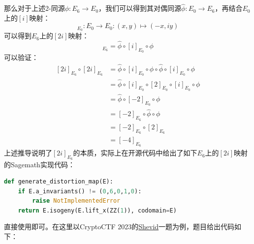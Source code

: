 \documentclass{book}
\numberwithin{equation}{subsubsection}
\begin{document}
那么对于上述2-同源$\phi:E_6\to E_0$，我们可以得到其对偶同源$\hat{\phi}:E_0\to E_6$，再结合$E_0$上的$[i]$映射：
\begin{equation}
    [i]_{E_0}:E_0\to E_0:(x,y)\mapsto(-x,iy)
    \nonumber
\end{equation}
可以得到$E_6$上的$[2i]$映射：
\begin{equation}
    [2i]_{E_6} = \hat{\phi}\circ[i]_{E_0}\circ\phi
    \nonumber
\end{equation}
可以验证：
\begin{equation}
    \begin{aligned}
        [2i]_{E_6}\circ[2i]_{E_6} 
        &= \hat{\phi}\circ[i]_{E_0}\circ\phi\circ\hat{\phi}\circ[i]_{E_0}\circ\phi\\
        &= \hat{\phi}\circ[i]_{E_0}\circ[2]_{E_0}\circ[i]_{E_0}\circ\phi\\
        &= \hat{\phi}\circ[-2]_{E_0}\circ\phi\\
        &= [-2]_{E_6}\circ\hat{\phi}\circ\phi\\
        &= [-2]_{E_6}\circ[2]_{E_6}\\
        &= [-4]_{E_6}
    \end{aligned}
    \nonumber
\end{equation}
上述推导说明了$[2i]_{E_6}$的本质，实际上在开源代码中给出了如下$E_6$上的$[2i]$映射的Sagemath实现代码：
\begin{lstlisting}[language=Python,basicstyle=\ttfamily,breaklines=true,keywordstyle=\bfseries\color{blue}]
def generate_distortion_map(E):
    if E.a_invariants() != (0,6,0,1,0):
        raise NotImplementedError
    return E.isogeny(E.lift_x(ZZ(1)), codomain=E)
\end{lstlisting}
直接使用即可。在这里以CryptoCTF 2023的\href{https://www.nssctf.cn/problem/4387}{Shevid}一题为例，题目给出代码如下：
\end{document}
